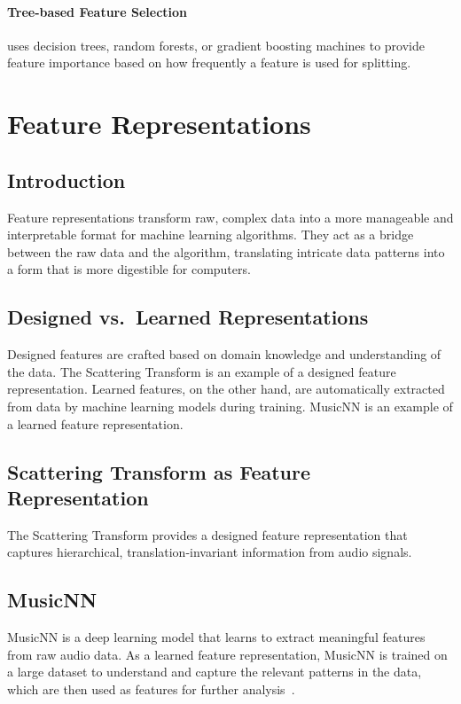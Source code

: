 \paragraph{Tree-based Feature Selection} uses decision trees, random forests, or gradient boosting machines to provide feature importance based on how frequently a feature is used for splitting.


\section{Feature Representations}
\label{sec:feature-representations}

\subsection{Introduction}

Feature representations transform raw, complex data into a more manageable and interpretable format for machine learning algorithms. They act as a bridge between the raw data and the algorithm, translating intricate data patterns into a form that is more digestible for computers.

\subsection{Designed vs.\ Learned Representations}

Designed features are crafted based on domain knowledge and understanding of the data. The Scattering Transform is an example of a designed feature representation. Learned features, on the other hand, are automatically extracted from data by machine learning models during training. MusicNN is an example of a learned feature representation.

\subsection{Scattering Transform as Feature Representation}

The Scattering Transform provides a designed feature representation that captures hierarchical, translation-invariant information from audio signals.

\subsection{MusicNN}

MusicNN is a deep learning model that learns to extract meaningful features from raw audio data. As a learned feature representation, MusicNN is trained on a large dataset to understand and capture the relevant patterns in the data, which are then used as features for further analysis~\cite{pons2019musicnn}.

